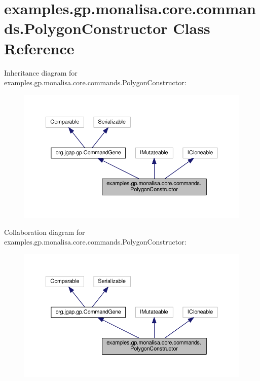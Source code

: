 \hypertarget{classexamples_1_1gp_1_1monalisa_1_1core_1_1commands_1_1_polygon_constructor}{\section{examples.\-gp.\-monalisa.\-core.\-commands.\-Polygon\-Constructor Class Reference}
\label{classexamples_1_1gp_1_1monalisa_1_1core_1_1commands_1_1_polygon_constructor}
}


Inheritance diagram for examples.\-gp.\-monalisa.\-core.\-commands.\-Polygon\-Constructor\-:
\nopagebreak
\begin{figure}[H]
\begin{center}
\leavevmode
\includegraphics[width=350pt]{classexamples_1_1gp_1_1monalisa_1_1core_1_1commands_1_1_polygon_constructor__inherit__graph}
\end{center}
\end{figure}


Collaboration diagram for examples.\-gp.\-monalisa.\-core.\-commands.\-Polygon\-Constructor\-:
\nopagebreak
\begin{figure}[H]
\begin{center}
\leavevmode
\includegraphics[width=350pt]{classexamples_1_1gp_1_1monalisa_1_1core_1_1commands_1_1_polygon_constructor__coll__graph}
\end{center}
\end{figure}

